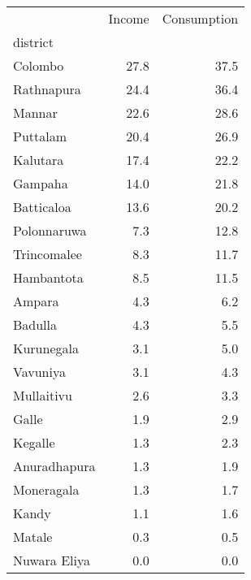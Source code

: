\begin{tabular}{lrr}
\toprule
{} &  Income &  Consumption \\
district     &         &              \\
\midrule
Colombo      &    27.8 &         37.5 \\
Rathnapura   &    24.4 &         36.4 \\
Mannar       &    22.6 &         28.6 \\
Puttalam     &    20.4 &         26.9 \\
Kalutara     &    17.4 &         22.2 \\
Gampaha      &    14.0 &         21.8 \\
Batticaloa   &    13.6 &         20.2 \\
Polonnaruwa  &     7.3 &         12.8 \\
Trincomalee  &     8.3 &         11.7 \\
Hambantota   &     8.5 &         11.5 \\
Ampara       &     4.3 &          6.2 \\
Badulla      &     4.3 &          5.5 \\
Kurunegala   &     3.1 &          5.0 \\
Vavuniya     &     3.1 &          4.3 \\
Mullaitivu   &     2.6 &          3.3 \\
Galle        &     1.9 &          2.9 \\
Kegalle      &     1.3 &          2.3 \\
Anuradhapura &     1.3 &          1.9 \\
Moneragala   &     1.3 &          1.7 \\
Kandy        &     1.1 &          1.6 \\
Matale       &     0.3 &          0.5 \\
Nuwara Eliya &     0.0 &          0.0 \\
\bottomrule
\end{tabular}
